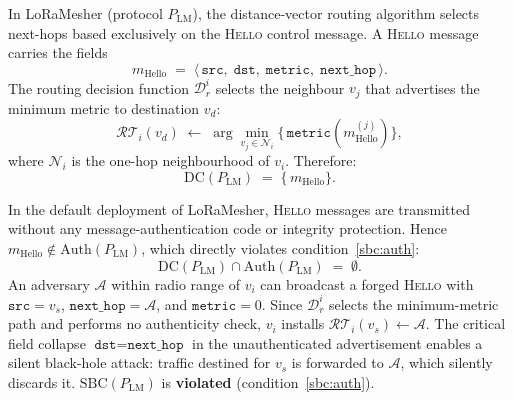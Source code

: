 \begin{example}
\label{ex:loramesher}
In LoRaMesher (protocol $P_{\mathrm{LM}}$), the distance-vector routing
algorithm selects next-hops based exclusively on the
\textsc{Hello} control message.  A \textsc{Hello} message carries the
fields
\[
  m_{\mathrm{Hello}} \;=\; \langle\,
    \texttt{src},\;\texttt{dst},\;\texttt{metric},\;\texttt{next\_hop}
  \,\rangle.
\]
The routing decision function $\mathcal{D}_r^i$ selects the neighbour
$v_j$ that advertises the minimum metric to destination $v_d$:
\[
  \mathcal{RT}_i(v_d) \;\leftarrow\;
  \arg\min_{v_j \in \mathcal{N}_i}
  \bigl\{\, \texttt{metric}(m^{(j)}_{\mathrm{Hello}}) \bigr\},
\]
where $\mathcal{N}_i$ is the one-hop neighbourhood of $v_i$.
Therefore:
\[
  \mathrm{DC}(P_{\mathrm{LM}}) \;=\; \bigl\{\, m_{\mathrm{Hello}} \bigr\}.
\]

In the default deployment of LoRaMesher, \textsc{Hello} messages are
transmitted without any message-authentication code or integrity
protection.  Hence $m_{\mathrm{Hello}} \notin \mathrm{Auth}(P_{\mathrm{LM}})$,
which directly violates condition~\ref{sbc:auth}:
\[
  \mathrm{DC}(P_{\mathrm{LM}}) \cap \mathrm{Auth}(P_{\mathrm{LM}}) \;=\; \emptyset.
\]
An adversary $\mathcal{A}$ within radio range of $v_i$ can broadcast a
forged \textsc{Hello} with $\texttt{src} = v_s$,
$\texttt{next\_hop} = \mathcal{A}$, and $\texttt{metric} = 0$.  Since
$\mathcal{D}_r^i$ selects the minimum-metric path and performs no
authenticity check, $v_i$ installs $\mathcal{RT}_i(v_s) \leftarrow \mathcal{A}$.
The critical field collapse $\texttt{dst} = \texttt{next\_hop}$ in the
unauthenticated advertisement enables a silent black-hole attack: traffic
destined for $v_s$ is forwarded to $\mathcal{A}$, which silently discards
it.  $\mathrm{SBC}(P_{\mathrm{LM}})$ is \textbf{violated} (condition~\ref{sbc:auth}).
\end{example}

